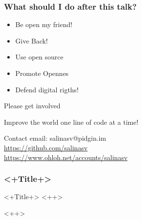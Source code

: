 \documentclass[hyperref={pdfpagelabels=false},xcolor=pst,pdf,fragile]{beamer}
\begin{document}
\begin{frame}
  \frametitle{What should I do after this talk?}

	  \begin{itemize}
		  \item Be open my friend!
			  \pause
		  \item Give Back!
			  \pause
		  \item Use open source
			  \pause
		  \item Promote Opennes
			  \pause
		  \item \alert{Defend digital rigths!}
	  \end{itemize}

  \pause
  \begin{alertblock}{\begin{center}Please get involved\end{center}}
	  \begin{center}
		  Improve the world one line of code at a time!
	  \end{center}
  \end{alertblock}

  \pause
  \begin{block}{Contact}
	  email: salinasv@pidgin.im \\
	  \url{https://github.com/salinasv} \\
	  \url{https://www.ohloh.net/accounts/salinasv}
  \end{block}

\end{frame}

\begin{frame}
  \frametitle{<+Title+>}

  \begin{block}{<+Title+>} %
    <++>
  \end{block}

\end{frame}

<++>
\end{document}
